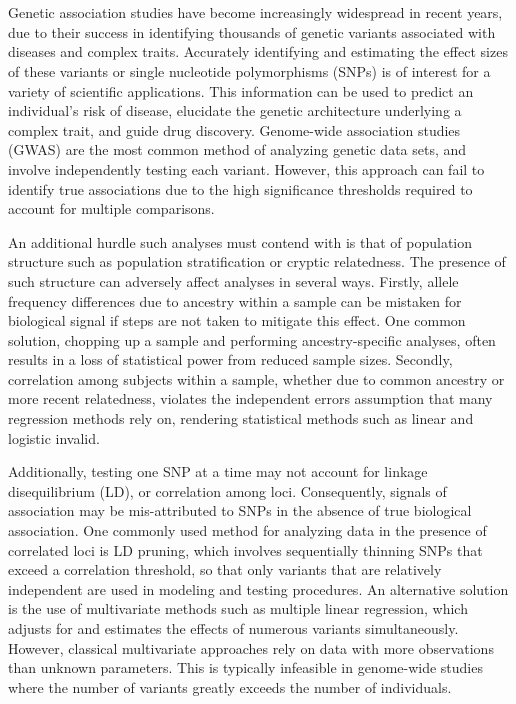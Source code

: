 
\section{}
Genetic association studies have become increasingly widespread in recent years, due to their success in identifying thousands of genetic variants associated with diseases and complex traits. Accurately identifying and estimating the effect sizes of these variants or single nucleotide polymorphisms (SNPs) is of interest for a variety of scientific applications. This information can be used to predict an individual's risk of disease, elucidate the genetic architecture underlying a complex trait, and guide drug discovery. Genome-wide association studies (GWAS) are the most common method of analyzing genetic data sets, and involve independently testing each variant. However, this approach can fail to identify true associations due to the high significance thresholds required to account for multiple comparisons.

An additional hurdle such analyses must contend with is that of population structure such as population stratification or cryptic relatedness. The presence of such structure can adversely affect analyses in several ways. Firstly, allele frequency differences due to ancestry within a sample can be mistaken for biological signal if steps are not taken to mitigate this effect. One common solution, chopping up a sample and performing ancestry-specific analyses, often results in a loss of statistical power from reduced sample sizes. Secondly, correlation among subjects within a sample, whether due to common ancestry or more recent relatedness, violates the independent errors assumption that many regression methods rely on, rendering statistical methods such as linear and logistic invalid.

Additionally, testing one SNP at a time may not account for linkage disequilibrium (LD), or correlation among loci. Consequently, signals of association may be mis-attributed to SNPs in the absence of true biological association. One commonly used method for analyzing data in the presence of correlated loci is LD pruning, which involves sequentially thinning SNPs that exceed a correlation threshold, so that only variants that are relatively independent are used in modeling and testing procedures. An alternative solution is the use of multivariate methods such as multiple linear regression, which adjusts for and estimates the effects of numerous variants simultaneously. However, classical multivariate approaches rely on data with more observations than unknown parameters. This is typically infeasible in genome-wide studies where the number of variants greatly exceeds the number of individuals. 

